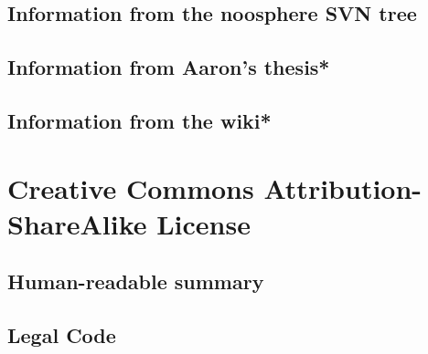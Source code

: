 \documentclass[12pt,report]{memoir}
\begin{document}
\section{Information from the noosphere SVN tree}


\section{Information from Aaron's thesis*}
\section{Information from the wiki*}


\chapter{Creative Commons Attribution-ShareAlike License}

\section{Human-readable summary}


\section{Legal Code}

\end{document}
